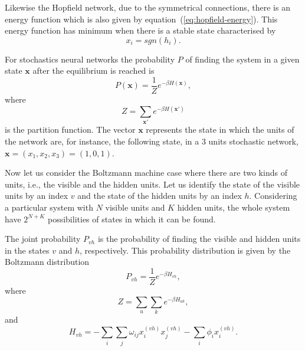 Likewise the Hopfield network, due to the symmetrical connections, there is an energy function which is also given by equation~(\ref{eq:hopfield-energy}). This energy function has minimum when there is a stable state characterised by
\begin{equation}
  \label{eq:stochastic-stable-state}
  x_{i} = sgn(h_{i}).
\end{equation}

For stochastics neural networks the probability $P$ of finding the system in a given state $\mathbf{x}$ after the equilibrium is reached is
\begin{equation}
  \label{eq:stochastic-prob}
  P(\mathbf{x}) = \frac{1}{Z} e^{-\beta H(\mathbf{x})},
\end{equation}
where
\begin{equation}
  \label{eq:stochastic-z}
  Z = \sum_{\mathbf{x}'} e^{-\beta H(\mathbf{x}')}
\end{equation}
is the partition function. The vector $\mathrm{\mathbf{x}}$ represents the state in which the units of the network are, for instance, the following state, in a 3 units stochastic network, $\mathrm{\mathbf{x}} = (x_{1}, x_{2}, x_{3}) = (1, 0, 1)$.

Now let us consider the Boltzmann machine case where there are two kinds of units, i.e., the visible and the hidden units. 
Let us identify the state of the visible units by an index $v$ and the state of the hidden units by an index $h$. 
Considering a particular system with $N$ visible units and $K$ hidden units, the whole system have $2^{N + K}$ possibilities of states in which it can be found.

The joint probability $P_{vh}$ is the probability of finding the visible and hidden units in the states $v$ and $h$, respectively.
This probability distribution is given by the Boltzmann distribution
\begin{equation}
  \label{eq:bm-joint-prob}
  P_{vh} = \frac{1}{Z}e^{-\beta H_{vh}},
\end{equation}
where
\begin{equation}
  \label{eq:bm-z}
  Z = \sum_{u} \sum_{k} e^{-\beta H_{uk}},
\end{equation}
and
\begin{equation}
  \label{eq:bm-energy-function}
  H_{vh} = - \sum_{i} \sum_{j} \omega_{ij} x^{(vh)}_{i} x^{(vh)}_{j} - \sum_{i} \phi_{i} x^{(vh)}_{i}.
\end{equation}

